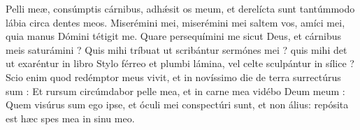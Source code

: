 
Pelli meæ, consúmptis cárnibus, adhǽsit os meum, et derelícta sunt tantúmmodo lábia circa dentes meos.
Miserémini mei, miserémini mei saltem vos, amíci mei, quia manus Dómini tétigit me.
Quare persequímini me sicut Deus, et cárnibus meis saturámini ?
Quis mihi tríbuat ut scribántur sermónes mei ? quis mihi det ut exaréntur in libro
Stylo férreo et plumbi lámina, vel celte sculpántur in sílice ?
Scio enim quod redémptor meus vivit, et in novíssimo die de terra surrectúrus sum :
Et rursum circúmdabor pelle mea, et in carne mea vidébo Deum meum :
Quem visúrus sum ego ipse, et óculi mei conspectúri sunt, et non álius: repósita est hæc spes mea in sinu meo.